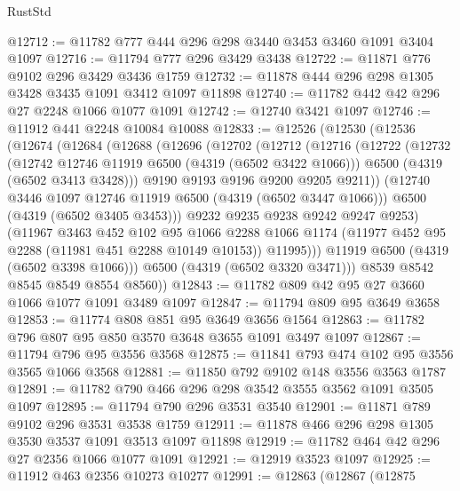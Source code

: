 \begin{lexlean}{RustStd}
\begin{coremodule}
@12712 := @11782 @777 @444 @296 @298 @3440 @3453 @3460 @1091 @3404 @1097
@12716 := @11794 @777 @296 @3429 @3438
@12722 := @11871 @776 @9102 @296 @3429 @3436 @1759
@12732 := @11878 @444 @296 @298 @1305 @3428 @3435 @1091 @3412 @1097 @11898
@12740 := @11782 @442 @42 @296 @27 @2248 @1066 @1077 @1091
@12742 := @12740 @3421 @1097
@12746 := @11912 @441 @2248 @10084 @10088
@12833 := @12526
    (@12530
      (@12536
        (@12674
          (@12684
            (@12688
              (@12696
                (@12702
                  (@12712
                    (@12716
                      (@12722
                        (@12732
                          (@12742 @12746 @11919 @6500 (@4319 (@6502 @3422 @1066)))
                          @6500
                          (@4319 (@6502 @3413 @3428)))
                        @9190
                        @9193
                        @9196
                        @9200
                        @9205
                        @9211))
                    (@12740 @3446 @1097 @12746 @11919 @6500 (@4319 (@6502 @3447 @1066)))
                    @6500
                    (@4319 (@6502 @3405 @3453)))
                  @9232
                  @9235
                  @9238
                  @9242
                  @9247
                  @9253)
                (@11967
                  @3463
                  @452
                  @102
                  @95
                  @1066
                  @2288
                  @1066
                  @1174
                  (@11977 @452 @95 @2288 (@11981 @451 @2288 @10149 @10153))
                  @11995)))
            @11919
            @6500
            (@4319 (@6502 @3398 @1066)))
          @6500
          (@4319 (@6502 @3320 @3471)))
        @8539
        @8542
        @8545
        @8549
        @8554
        @8560))
@12843 := @11782 @809 @42 @95 @27 @3660 @1066 @1077 @1091 @3489 @1097
@12847 := @11794 @809 @95 @3649 @3658
@12853 := @11774 @808 @851 @95 @3649 @3656 @1564
@12863 := @11782 @796 @807 @95 @850 @3570 @3648 @3655 @1091 @3497 @1097
@12867 := @11794 @796 @95 @3556 @3568
@12875 := @11841 @793 @474 @102 @95 @3556 @3565 @1066 @3568
@12881 := @11850 @792 @9102 @148 @3556 @3563 @1787
@12891 := @11782 @790 @466 @296 @298 @3542 @3555 @3562 @1091 @3505 @1097
@12895 := @11794 @790 @296 @3531 @3540
@12901 := @11871 @789 @9102 @296 @3531 @3538 @1759
@12911 := @11878 @466 @296 @298 @1305 @3530 @3537 @1091 @3513 @1097 @11898
@12919 := @11782 @464 @42 @296 @27 @2356 @1066 @1077 @1091
@12921 := @12919 @3523 @1097
@12925 := @11912 @463 @2356 @10273 @10277
@12991 := @12863
    (@12867
      (@12875

\end{coremodule}
\end{lexlean}
